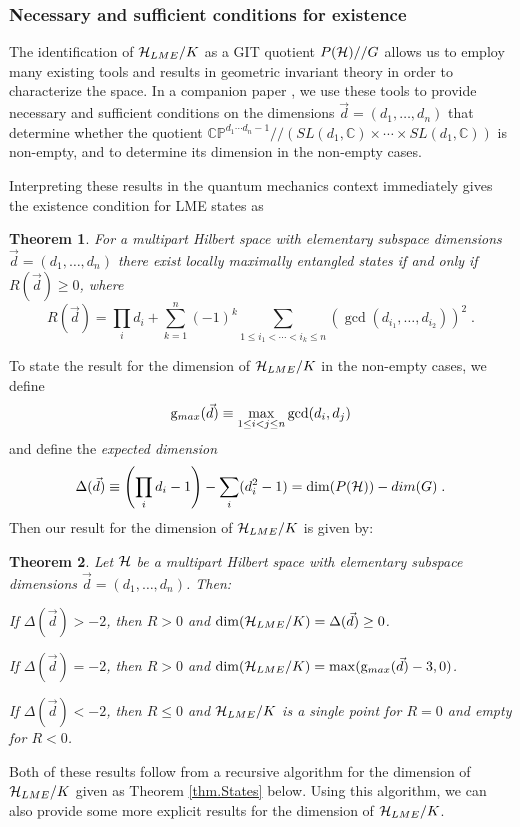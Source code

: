 \documentclass[12pt]{article}
\newtheorem{theorem}{Theorem}[section]
\theoremstyle{definition}
\newcommand{\be}{\begin{equation}}
\newcommand{\ee}{\end{equation}}
\newcommand{\GITquot}{/\!/}
\begin{document}
\subsubsection{Necessary and sufficient conditions for existence}

The identification of ${\cal H}_{LME}/K$ as a GIT quotient $P({\cal H})//G$ allows us to employ many existing tools and results in geometric invariant theory in order to characterize the space. In a companion paper \cite{mathpaper}, we use these tools to provide necessary and sufficient conditions on the dimensions $\vec{d} = (d_1, \dots, d_n)$ that determine whether the quotient $\mathbb{CP}^{d_1 \cdots d_n - 1}\GITquot (SL(d_1, \mathbb{C}) \times \cdots \times SL(d_1, \mathbb{C}))$ is non-empty, and to determine its dimension in the non-empty cases. 

Interpreting these results in the quantum mechanics context immediately gives the existence condition for LME states as
\begin{theorem}\label{thm.R}
For a multipart Hilbert space with elementary subspace dimensions $\vec{d} = (d_1, \dots, d_n)$ there exist locally maximally entangled states if and only if $R(\vec{d}) \ge 0$, where
\be
R(\vec{d}) = \prod_i d_i + \sum_{k=1}^n (-1)^k \sum_{1 \le i_1 < \cdots < i_k \le n} (\gcd(d_{i_1},\dots,d_{i_2}))^2 \; .
\ee
\end{theorem}
To state the result for the dimension of ${\cal H}_{LME}/K$ in the non-empty cases,  we define
\be
\label{gmd}
{\rm g}_{max}(\vec{d}) \equiv \max_{1 \le i < j \le n} \gcd(d_i,d_j)
\ee
and define the {\it expected dimension}
\be
\label{defDelta}
\Delta(\vec{d}) \equiv \left(\prod_i d_i - 1 \right) - \sum_i (d_i^2 - 1) = \dim(P({\cal H})) - dim(G) \; .
\ee
Then our result for the dimension of ${\cal H}_{LME}/K$ is given by:
\begin{theorem}\label{thm.dims}
Let ${\cal H}$ be a multipart Hilbert space with elementary subspace dimensions $\vec{d} = (d_1, \dots, d_n)$. Then:

If $\Delta(\vec{d}) > -2$, then $R > 0$ and $\dim({\cal H}_{LME}/K) = \Delta(\vec{d}) \ge 0$.

If $\Delta(\vec{d}) = -2$, then $R > 0$ and $\dim({\cal H}_{LME}/K)  = \max ({\rm g}_{max}(\vec{d}) -3,0)$.

If $\Delta(\vec{d}) < -2$, then $R \le 0$ and ${\cal H}_{LME}/K$ is a single point for $R=0$ and empty for $R<0$.
\end{theorem}

Both of these results follow from a recursive algorithm for the dimension of ${\cal H}_{LME}/K$ given as Theorem \ref{thm.States} below. Using this algorithm, we can also provide some more explicit results
for the dimension of ${\cal H}_{LME}/K$.
\end{document}
